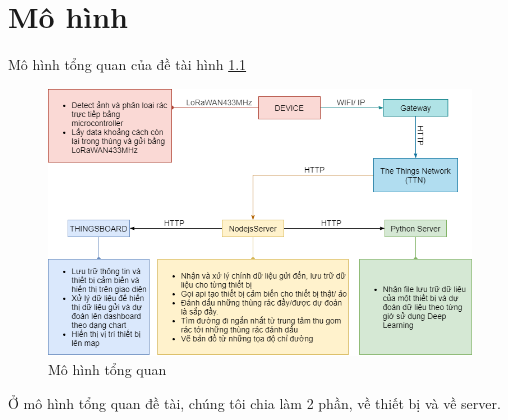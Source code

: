 
\chapter{ Mô hình}

Mô hình tổng quan của đề tài hình \ref{fig:general_chart}
\begin{figure}[H]
    \centering
    \includegraphics[width=\textwidth]{images/general_chart.png}
    \caption{Mô hình tổng quan}
    \label{fig:general_chart}
\end{figure}
Ở mô hình tổng quan đề tài, chúng tôi chia làm 2 phần, về thiết bị và về server.

